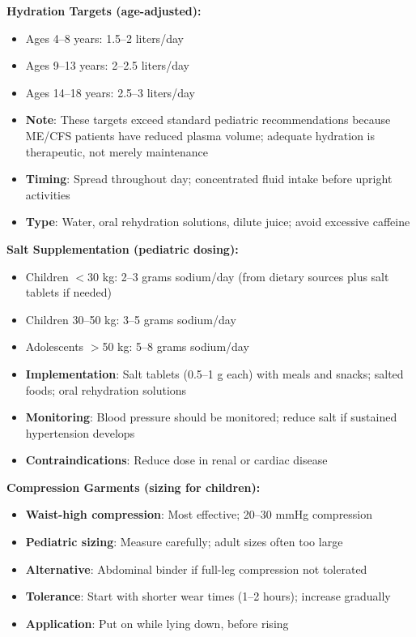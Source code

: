 \begin{protocol}
\label{protocol:ped-oi-nonpharm}

\textbf{Hydration Targets (age-adjusted):}
\begin{itemize}
    \item Ages 4--8 years: 1.5--2 liters/day
    \item Ages 9--13 years: 2--2.5 liters/day
    \item Ages 14--18 years: 2.5--3 liters/day
    \item \textbf{Note}: These targets exceed standard pediatric recommendations because ME/CFS patients have reduced plasma volume; adequate hydration is therapeutic, not merely maintenance
    \item \textbf{Timing}: Spread throughout day; concentrated fluid intake before upright activities
    \item \textbf{Type}: Water, oral rehydration solutions, dilute juice; avoid excessive caffeine
\end{itemize}

\textbf{Salt Supplementation (pediatric dosing):}
\begin{itemize}
    \item Children $<$30 kg: 2--3 grams sodium/day (from dietary sources plus salt tablets if needed)
    \item Children 30--50 kg: 3--5 grams sodium/day
    \item Adolescents $>$50 kg: 5--8 grams sodium/day
    \item \textbf{Implementation}: Salt tablets (0.5--1 g each) with meals and snacks; salted foods; oral rehydration solutions
    \item \textbf{Monitoring}: Blood pressure should be monitored; reduce salt if sustained hypertension develops
    \item \textbf{Contraindications}: Reduce dose in renal or cardiac disease
\end{itemize}

\textbf{Compression Garments (sizing for children):}
\begin{itemize}
    \item \textbf{Waist-high compression}: Most effective; 20--30 mmHg compression
    \item \textbf{Pediatric sizing}: Measure carefully; adult sizes often too large
    \item \textbf{Alternative}: Abdominal binder if full-leg compression not tolerated
    \item \textbf{Tolerance}: Start with shorter wear times (1--2 hours); increase gradually
    \item \textbf{Application}: Put on while lying down, before rising
\end{itemize}


\end{protocol}

